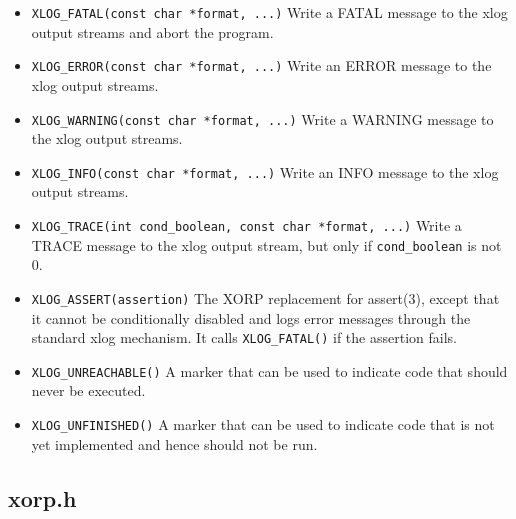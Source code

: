 \documentclass[11pt]{article}
\begin{document}
\begin{itemize}

  \item \verb=XLOG_FATAL(const char *format, ...)=
  \newline
  Write a FATAL message to the xlog output streams and abort the program.

  \item \verb=XLOG_ERROR(const char *format, ...)=
  \newline
  Write an ERROR message to the xlog output streams.

  \item \verb=XLOG_WARNING(const char *format, ...)=
  \newline
  Write a WARNING message to the xlog output streams.

  \item \verb=XLOG_INFO(const char *format, ...)=
  \newline
  Write an INFO message to the xlog output streams.

  \item \verb=XLOG_TRACE(int cond_boolean, const char *format, ...)=
  \newline
  Write a TRACE message to the xlog output stream, but only
  if \verb=cond_boolean= is not 0.

  \item \verb=XLOG_ASSERT(assertion)=
  \newline
  The XORP replacement for assert(3), except that it cannot be
  conditionally disabled and logs error messages through the standard
  xlog mechanism. It calls \verb=XLOG_FATAL()= if the assertion fails.

  \item \verb=XLOG_UNREACHABLE()=
  \newline
  A marker that can be used to indicate code that should never be
  executed.

  \item \verb=XLOG_UNFINISHED()=
  \newline
  A marker that can be used to indicate code that is not yet implemented
  and hence should not be run.

\end{itemize}

\subsection{xorp.h}
\end{document}
